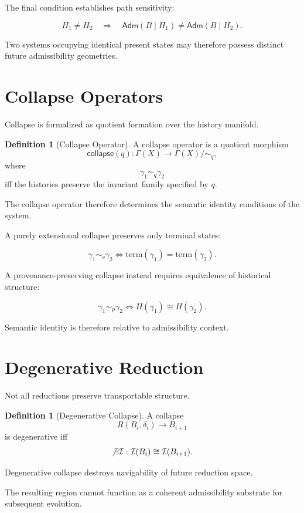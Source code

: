 \documentclass[12pt,openany]{book}
\theoremstyle{plain}
\theoremstyle{definition}
\newtheorem{definition}[theorem]{Definition}
\theoremstyle{remark}
\newcommand{\scollapse}[1]{\mathsf{collapse}\!\left(#1\right)}
\begin{document}
The final condition establishes path sensitivity:

\[
H_1 \neq H_2
\quad\Rightarrow\quad
\mathsf{Adm}(B\mid H_1)
\neq
\mathsf{Adm}(B\mid H_2).
\]

Two systems occupying identical present states may therefore
possess distinct future admissibility geometries.

\section{Collapse Operators}

Collapse is formalized as quotient formation over the history
manifold.

\begin{definition}[Collapse Operator]
A collapse operator is a quotient morphism
\[
\scollapse{q} :
\Gamma(X)
\to
\Gamma(X)/{\sim_q},
\]
where
\[
\gamma_1 \sim_q \gamma_2
\]
iff the histories preserve the invariant family specified by
\(q\).
\end{definition}

The collapse operator therefore determines the semantic identity
conditions of the system.

A purely extensional collapse preserves only terminal states:

\[
\gamma_1 \sim_v \gamma_2
\iff
\mathrm{term}(\gamma_1)
=
\mathrm{term}(\gamma_2).
\]

A provenance-preserving collapse instead requires equivalence of
historical structure:

\[
\gamma_1 \sim_p \gamma_2
\iff
H(\gamma_1)\cong H(\gamma_2).
\]

Semantic identity is therefore relative to admissibility context.

\section{Degenerative Reduction}

Not all reductions preserve transportable structure.

\begin{definition}[Degenerative Collapse]
A collapse
\[
R(B_i,\delta_i)\to B_{i+1}
\]
is degenerative iff
\[
\not\exists \mathcal{I}
:
\mathcal{I}(B_i)
\cong
\mathcal{I}(B_{i+1}).
\]
\end{definition}

Degenerative collapse destroys navigability of future reduction
space.

The resulting region cannot function as a coherent admissibility
substrate for subsequent evolution.
\end{document}
